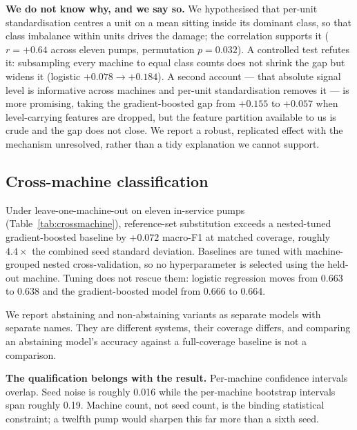 \documentclass[conference,a4paper,10pt]{IEEEtran}
\begin{document}
\textbf{We do not know why, and we say so.} We hypothesised that per-unit
standardisation centres a unit on a mean sitting inside its dominant class, so
that class imbalance within units drives the damage; the correlation supports it
($r=+0.64$ across eleven pumps, permutation $p=0.032$). A controlled test
refutes it: subsampling every machine to equal class counts does not shrink the
gap but widens it (logistic $+0.078 \to +0.184$). A second account --- that
absolute signal level is informative across machines and per-unit standardisation
removes it --- is more promising, taking the gradient-boosted gap from $+0.155$ to
$+0.057$ when level-carrying features are dropped, but the feature partition
available to us is crude and the gap does not close. We report a robust,
replicated effect with the mechanism unresolved, rather than a tidy explanation
we cannot support.

\subsection{Cross-machine classification}
Under leave-one-machine-out on eleven in-service pumps
(Table~\ref{tab:crossmachine}), reference-set substitution exceeds a nested-tuned
gradient-boosted baseline by $+0.072$ macro-F1 at matched coverage, roughly
$4.4\times$ the combined seed standard deviation. Baselines are tuned with
machine-grouped nested cross-validation, so no hyperparameter is selected using
the held-out machine. Tuning does not rescue them: logistic regression moves from
0.663 to 0.638 and the gradient-boosted model from 0.666 to 0.664.

We report abstaining and non-abstaining variants as separate models with separate
names. They are different systems, their coverage differs, and comparing an
abstaining model's accuracy against a full-coverage baseline is not a comparison.

\textbf{The qualification belongs with the result.} Per-machine confidence
intervals overlap. Seed noise is roughly 0.016 while the per-machine bootstrap
intervals span roughly 0.19. Machine count, not seed count, is the binding
statistical constraint; a twelfth pump would sharpen this far more than a sixth
seed.
\end{document}
